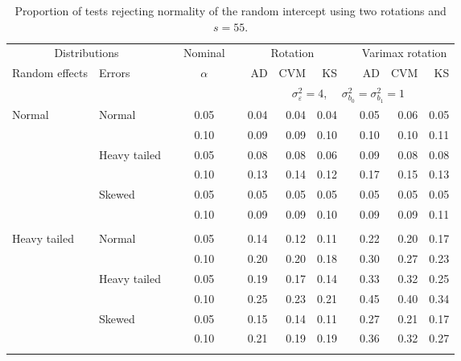 \begin{table}[ht]
\centering
\caption{\label{tab:simb0s55} Proportion of tests rejecting normality of the random intercept using two rotations and $s = 55$.}
\begin{scriptsize}
\begin{tabular}{ll p{.1cm} c p{.1cm} rrr p{.1cm} rrr}
  \hline
  \multicolumn{2}{c}{Distributions}& & Nominal & &  \multicolumn{3}{c}{Rotation} & & \multicolumn{3}{c}{Varimax rotation} \\ \cline{1-2} \cline{6-8} \cline{10-12}   
  Random effects & Errors & & $\alpha$ & & AD & CVM & KS & & AD & CVM & KS \\ 
   \hline
& && && \multicolumn{7}{c}{$\sigma_{\varepsilon}^2 = 4$, \ \ $\sigma_{b_0}^2 = \sigma_{b_1}^2 = 1$} \\ \cline{6-12}
\rowcolor{gray!20}Normal       & Normal       && 0.05 &&   0.04 & 0.04 & 0.04 && 0.05 & 0.06 & 0.05 \\ 
\rowcolor{gray!20}             &              && 0.10 &&   0.09 & 0.09 & 0.10 && 0.10 & 0.10 & 0.11 \\ 
\rowcolor{gray!20}             & Heavy tailed && 0.05 &&   0.08 & 0.08 & 0.06 && 0.09 & 0.08 & 0.08 \\ 
\rowcolor{gray!20}             &              && 0.10 &&   0.13 & 0.14 & 0.12 && 0.17 & 0.15 & 0.13 \\ 
\rowcolor{gray!20}             & Skewed       && 0.05 &&   0.05 & 0.05 & 0.05 && 0.05 & 0.05 & 0.05 \\ 
\rowcolor{gray!20}             &              && 0.10 &&   0.09 & 0.09 & 0.10 && 0.09 & 0.09 & 0.11 \\ 
             &&&&&&&&&&&\\
Heavy tailed & Normal       && 0.05 &&   0.14 & 0.12 & 0.11 && 0.22 & 0.20 & 0.17 \\ 
             &              && 0.10 &&   0.20 & 0.20 & 0.18 && 0.30 & 0.27 & 0.23 \\ 
             & Heavy tailed && 0.05 &&   0.19 & 0.17 & 0.14 && 0.33 & 0.32 & 0.25 \\ 
             &              && 0.10 &&   0.25 & 0.23 & 0.21 && 0.45 & 0.40 & 0.34 \\ 
             & Skewed       && 0.05 &&   0.15 & 0.14 & 0.11 && 0.27 & 0.21 & 0.17 \\ 
             &              && 0.10 &&   0.21 & 0.19 & 0.19 && 0.36 & 0.32 & 0.27 \\ 
             &&&&&&&&&&&\\

\end{tabular}
\end{scriptsize}
\end{table}
